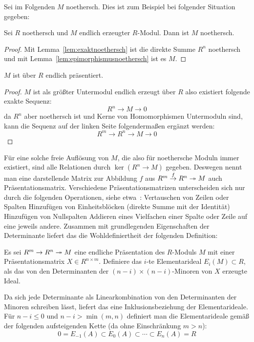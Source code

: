 Sei im Folgenden $M$ noethersch. Dies ist zum Beispiel bei folgender Situation gegeben:
\begin{cor}
	Sei $R$ noethersch und $M$ endlich erzeugter $R$-Modul. Dann ist $M$ noethersch.
\end{cor}
\begin{proof}
	Mit Lemma~\ref{lem:exaktnoethersch} ist die direkte Summe $R^n$ noethersch und mit Lemma~\ref{lem:epimorphismusnoethersch} ist es $M$.
\end{proof}
\begin{lem}
	$M$ ist über $R$ endlich präsentiert. 
\end{lem}
\begin{proof}
	$M$ ist als größter Untermodul endlich erzeugt über $R$ also existiert folgende exakte Sequenz:
	\[
		R^n \to M \to 0
	\]
	da $R^n$ aber noethersch ist und Kerne von Homomorphismen Untermoduln sind, kann die Sequenz auf der linken Seite folgendermaßen ergänzt werden:
	\[
		R^m \to R^n \to M \to 0
	\]
\end{proof}

 Für eine solche freie Auflösung von $M$, die also für noethersche Moduln immer existiert, sind alle Relationen durch $\ker(R^n\to M)$ gegeben. Deswegen nennt man eine darstellende Matrix zur Abbildung $f$ aus $R^m \stackrel f \to R^n \twoheadrightarrow M$ auch Präsentationsmatrix. Verschiedene Präsentationsmatrizen unterscheiden sich nur durch die folgenden Operationen, siehe etwa~\cite[Theorem~6.1]{LickorishW.B.Raymond.1997}:
	\textbullet Vertauschen von Zeilen oder Spalten \textbullet Hinzufügen von Einheitsblöcken (direkte Summe mit der Identität) \textbullet Hinzufügen von Nullspalten \textbullet Addieren eines Vielfachen einer Spalte oder Zeile auf eine jeweils andere. Zusammen mit grundlegenden Eigenschaften der Determinante liefert das die Wohldefiniertheit der folgenden Definition:
	\begin{defn}
	Es sei $R^m \to R^n \twoheadrightarrow M$ eine endliche Präsentation des $R$-Moduls $M$ mit einer Präsentationsmatrix $X \in R^{n \times m}$. Definiere das $i$-te Elementarideal $E_i(M) \subset R$, als das von den Determinanten der $(n-i)\times (n-i)$-Minoren von $X$ erzeugte Ideal.
    	\end{defn}

        Da sich jede Determinante als Linearkombination von den Determinanten der Minoren schreiben lässt, liefert das eine Inklusionsbeziehung der Elementarideale. Für $n-i\leq 0$ und $n-i > \min(m,n)$ definiert man die Elementarideale gemäß der folgenden aufsteigenden Kette (da ohne Einschränkung $m>n$):
        \[
             0=E_{-1}(A)\subset E_0(A) \subset \cdots \subset E_n(A) = R
         \] 

